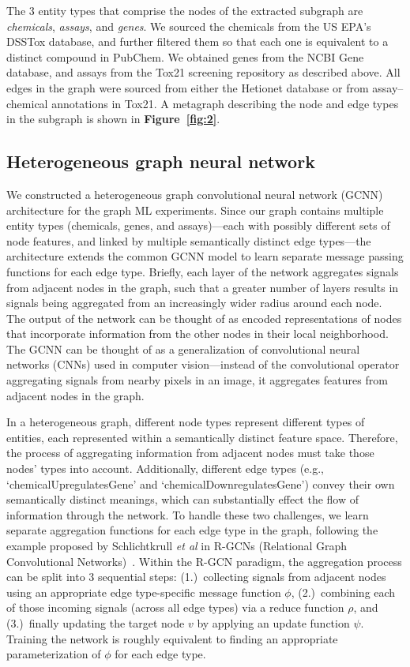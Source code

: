 \documentclass{ws-procs11x85}
\begin{document}
The 3 entity types that comprise the nodes of the extracted subgraph are \textit{chemicals}, \textit{assays}, and \textit{genes}.
We sourced the chemicals from the US EPA's DSSTox database, and further filtered them so that each one is equivalent to a distinct compound in PubChem.
We obtained genes from the NCBI Gene database, and assays from the Tox21 screening repository as described above.
All edges in the graph were sourced from either the Hetionet database or from assay--chemical annotations in Tox21.
A metagraph describing the node and edge types in the subgraph is shown in \textbf{Figure~\ref{fig:2}}.

\subsection{Heterogeneous graph neural network}
We constructed a heterogeneous graph convolutional neural network (GCNN) architecture for the graph ML experiments.
Since our graph contains multiple entity types (chemicals, genes, and assays)---each with possibly different sets of node features, and linked by multiple semantically distinct edge types---the architecture extends the common GCNN model to learn separate message passing functions for each edge type.
Briefly, each layer of the network aggregates signals from adjacent nodes in the graph, such that a greater number of layers results in signals being aggregated from an increasingly wider radius around each node.
The output of the network can be thought of as encoded representations of nodes that incorporate information from the other nodes in their local neighborhood.
The GCNN can be thought of as a generalization of convolutional neural networks (CNNs) used in computer vision---instead of the convolutional operator aggregating signals from nearby pixels in an image, it aggregates features from adjacent nodes in the graph.

In a heterogeneous graph, different node types represent different types of entities, each represented within a semantically distinct feature space.
Therefore, the process of aggregating information from adjacent nodes must take those nodes' types into account.
Additionally, different edge types (e.g., `chemicalUpregulatesGene' and `chemicalDownregulatesGene') convey their own semantically distinct meanings, which can substantially effect the flow of information through the network.
To handle these two challenges, we learn separate aggregation functions for each edge type in the graph, following the example proposed by Schlichtkrull \textit{et al} in R-GCNs (Relational Graph Convolutional Networks)~\cite{schlichtkrull2018modeling}.
Within the R-GCN paradigm, the aggregation process can be split into 3 sequential steps: (1.)~collecting signals from adjacent nodes using an appropriate edge type-specific message function $\phi$, (2.)~combining each of those incoming signals (across all edge types) via a reduce function $\rho$, and (3.)~finally updating the target node $v$ by applying an update function $\psi$.
Training the network is roughly equivalent to finding an appropriate parameterization of $\phi$ for each edge type.
\end{document}
